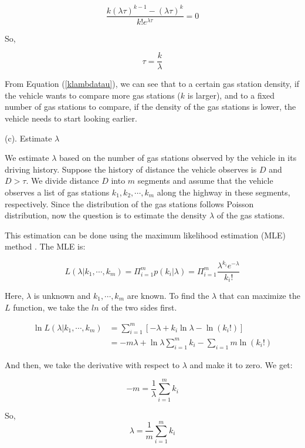 \documentclass[conference]{IEEEtran}
\theoremstyle{definition}
\begin{document}
\[ \frac{k(\lambda \tau)^{k-1}-(\lambda \tau)^k} {k! e^{\lambda \tau}} =0 \]

So,

\begin{equation}\label{klambdatau}
  \tau = \frac{k}{\lambda}
\end{equation}

From Equation (\ref{klambdatau}), we can see that to a certain gas station density, if the vehicle wants to compare more gas stations ($k$ is larger), and to a fixed number of gas stations to compare, if the density of the gas stations is lower, the vehicle needs to start looking earlier.

\noindent (c). Estimate   $\lambda$

We estimate $\lambda$ based on the number of gas stations observed by the vehicle in its driving history. Suppose the history of distance the vehicle observes is $D$ and $D>\tau$. We divide distance $D$ into $m$ segments and assume that the vehicle observes a list of gas stations $k_1, k_2, \cdots, k_m $ along the highway in these segments, respectively. Since the distribution of the gas stations follows Poisson distribution,  now the question is to estimate the density $\lambda$  of the gas stations.

This estimation can be done using the  maximum likelihood estimation (MLE) method \cite{MLE}.   The MLE is:

\[ L(\lambda|k_1, \cdots, k_m) = \Pi_{i=1}^{m}p(k_i|\lambda) = \Pi_{i=1}^{m}\frac{{\lambda}^{k_{i}}e^{-\lambda}}{k_{i}!} \]

Here, $\lambda$ is unknown and $k_1, \cdots, k_m$ are known. To find the $\lambda$ that can maximize the $L$ function, we take the $ln$ of the two sides first.

\begin{align*}
\ln L(\lambda|k_1, \cdots, k_m) &= \sum_{i=1}^{m}[-\lambda+k_{i}\ln \lambda - \ln(k_{i}!)] \\
                                &= -m \lambda + \ln \lambda \sum_{i=1}^{m}k_{i}-\sum_{i=1}{m}\ln (k_{i}!)
\end{align*}

And then, we take the derivative with respect to $\lambda$ and make it to zero. We get:

\[-m = \frac{1}{\lambda}\sum_{i=1}^{m}k_{i} \]

So,
\begin{equation} \label{lambda}
\lambda = \frac{1}{m} \sum_{i=1}^{m}k_{i}
\end{equation}
\end{document}
